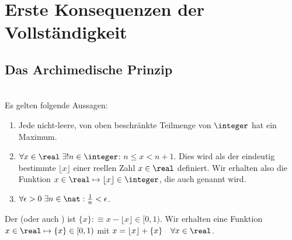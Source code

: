 \section{Erste Konsequenzen der Vollständigkeit}

\subsection{Das Archimedische Prinzip}

\begin{thm}
  \phantom{.} \\
  Es gelten folgende Aussagen:
  \begin{enumerate}
    \item Jede nicht-leere, von oben beschränkte Teilmenge von $\integer$ hat ein Maximum.
    \item $\forall x \in \real \; \exists! n \in \integer$: $n \leq x < n+1$. Dies wird als der eindeutig bestimmte  $\lfloor x \rfloor$ einer reellen Zahl $x \in \real$ definiert. Wir erhalten also die Funktion $x \in \real \mapsto \lfloor x \rfloor \in \integer$, die auch  genannt wird.
    \item $\forall \epsilon > 0 \; \exists n \in \nat: \frac{1}{n} < \epsilon$.
  \end{enumerate}
\end{thm}
Der  (oder auch ) ist $\{ x\} :\equiv x - \lfloor x \rfloor \in [0,1)$. Wir erhalten eine Funktion $x \in \real \mapsto \{ x\} \in [0, 1)$ mit $x=\lfloor x \rfloor + \{ x\} \quad \forall x \in \real$.